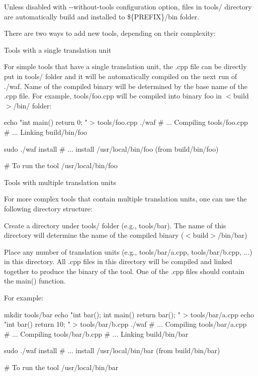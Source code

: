 Unless disabled with {\ttfamily -\/-\/without-\/tools} configuration option, files in {\ttfamily tools/} directory are automatically build and installed to {\ttfamily \$\{P\+R\+E\+F\+IX\}/bin} folder.

There are two ways to add new tools, depending on their complexity\+:


\begin{DoxyEnumerate}
\item Tools with a single translation unit

For simple tools that have a single translation unit, the {\ttfamily .cpp} file can be directly put in {\ttfamily tools/} folder and it will be automatically compiled on the next run of {\ttfamily ./waf}. Name of the compiled binary will be determined by the base name of the {\ttfamily .cpp} file. For example, {\ttfamily tools/foo.\+cpp} will be compiled into binary {\ttfamily foo} in {\ttfamily $<$build$>$/bin/} folder\+: \begin{DoxyVerb}  echo "int main() { return 0; }" > tools/foo.cpp
  ./waf
  # ... Compiling tools/foo.cpp
  # ... Linking build/bin/foo

  sudo ./waf install
  # ... install /usr/local/bin/foo (from build/bin/foo)

  # To run the tool
  /usr/local/bin/foo
\end{DoxyVerb}

\item Tools with multiple translation units

For more complex tools that contain multiple translation units, one can use the following directory structure\+:
\begin{DoxyItemize}
\item Create a directory under {\ttfamily tools/} folder (e.\+g., {\ttfamily tools/bar}). The name of this directory will determine the name of the compiled binary ({\ttfamily $<$build$>$/bin/bar})
\item Place any number of translation units (e.\+g., {\ttfamily tools/bar/a.\+cpp}, {\ttfamily tools/bar/b.\+cpp}, ...) in this directory. All {\ttfamily .cpp} files in this directory will be compiled and linked together to produce the binary of the tool. One of the .cpp files should contain the {\ttfamily main()} function.
\end{DoxyItemize}

For example\+: \begin{DoxyVerb}  mkdir tools/bar
  echo "int bar(); int main() { return bar(); }" > tools/bar/a.cpp
  echo "int bar() { return 10; } " > tools/bar/b.cpp
  ./waf
  # ... Compiling tools/bar/a.cpp
  # ... Compiling tools/bar/b.cpp
  # ... Linking build/bin/bar

  sudo ./waf install
  # ... install /usr/local/bin/bar (from build/bin/bar)

  # To run the tool
  /usr/local/bin/bar\end{DoxyVerb}
 
\end{DoxyEnumerate}